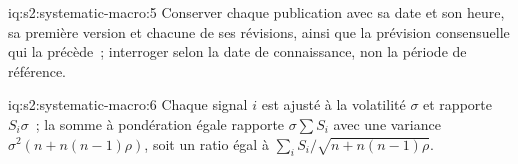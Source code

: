 \begin{solution}{iq:s2:systematic-macro:5}
Conserver chaque publication avec sa date et son heure, sa première version et chacune de ses révisions, ainsi que la prévision consensuelle qui la précède~; interroger selon la date de connaissance, non
la période de référence.
\end{solution}

\begin{solution}{iq:s2:systematic-macro:6}
Chaque signal $i$ est ajusté à la volatilité $\sigma$ et rapporte $S_i\sigma$~; la somme à pondération égale rapporte $\sigma\sum S_i$ avec une variance $\sigma^2(n +
n(n - 1)\rho)$, soit un ratio égal à $\sum_i S_i/\sqrt{n + n(n - 1)\rho}$.
\end{solution}
